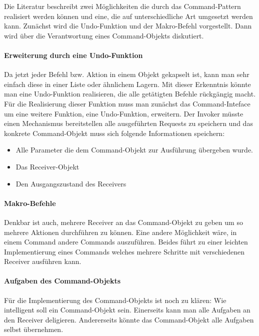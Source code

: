 Die Literatur beschreibt zwei  Möglichkeiten die  durch das Command-Pattern realisiert werden können und eine, die auf unterschiedliche Art umgesetzt werden kann. Zunächst wird die Undo-Funktion und der Makro-Befehl vorgestellt. Dann wird über die Verantwortung eines Command-Objekts diskutiert.

\paragraph{Erweiterung durch eine Undo-Funktion} Da jetzt jeder Befehl bzw. Aktion in einem Objekt gekapselt ist, kann man sehr einfach diese in einer Liste oder ähnlichem Lagern. Mit dieser Erkenntnis könnte man eine Undo-Funktion realisieren, die alle getätigten Befehle rückgängig macht. Für die Realisierung dieser Funktion muss man zunächst das Command-Inteface um eine weitere Funktion, eine Undo-Funktion, erweitern. Der Invoker müsste einen Mechanismus bereitstellen alle ausgeführten Requests zu speichern und das konkrete Command-Objekt muss sich folgende Informationen speichern:
\begin{itemize}
	\item Alle Parameter die dem Command-Objekt zur Ausführung übergeben wurde.
	\item Das Receiver-Objekt
	\item Den Ausgangszustand des Receivers
\end{itemize}

\paragraph{Makro-Befehle} Denkbar ist auch, mehrere Receiver an das Command-Objekt zu geben um so mehrere Aktionen durchführen zu können. Eine andere Möglichkeit wäre, in einem Command andere Commands auszuführen. Beides führt zu einer leichten Implementierung eines Commands welches mehrere Schritte mit verschiedenen Receiver ausführen kann.

\paragraph{Aufgaben des Command-Objekts} Für die Implementierung des Command-Objekts ist noch zu klären: Wie intelligent soll ein Command-Objekt sein. Einerseits kann man alle Aufgaben an den Receiver deligieren. Andererseits könnte das Command-Objekt alle Aufgaben selbst übernehmen. 
